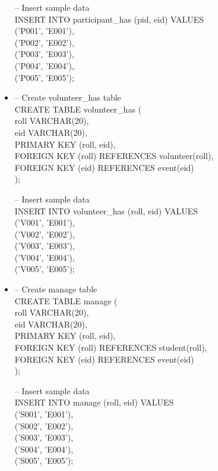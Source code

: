 \documentclass[7pt]{article}
\begin{document}
\begin{itemize}
    -- Insert sample data   \\
    INSERT INTO participant\_has (pid, eid) VALUES  \\
        ('P001', 'E001'),   \\
        ('P002', 'E002'),   \\
        ('P003', 'E003'),   \\
        ('P004', 'E004'),   \\
        ('P005', 'E005');
    
    \newpage

    \item -- Create volunteer\_has table \\
CREATE TABLE volunteer\_has (    \\
    roll VARCHAR(20),   \\
    eid VARCHAR(20),    \\
    PRIMARY KEY (roll, eid),    \\
    FOREIGN KEY (roll) REFERENCES volunteer(roll),  \\
    FOREIGN KEY (eid) REFERENCES event(eid) \\
);  \vspace{2pt}

-- Insert sample data   \\
INSERT INTO volunteer\_has (roll, eid) VALUES   \\
    ('V001', 'E001'),   \\
    ('V002', 'E002'),   \\
    ('V003', 'E003'),   \\
    ('V004', 'E004'),   \\
    ('V005', 'E005');

    \item -- Create manage table    \\
    CREATE TABLE manage (   \\
        roll VARCHAR(20),   \\
        eid VARCHAR(20),    \\
        PRIMARY KEY (roll, eid),    \\
        FOREIGN KEY (roll) REFERENCES student(roll),    \\
        FOREIGN KEY (eid) REFERENCES event(eid) \\
    );  \vspace{2pt}
    
    -- Insert sample data   \\
    INSERT INTO manage (roll, eid) VALUES   \\
        ('S001', 'E001'),   \\
        ('S002', 'E002'),   \\
        ('S003', 'E003'),   \\
        ('S004', 'E004'),   \\
        ('S005', 'E005');


\end{itemize}
\end{document}
